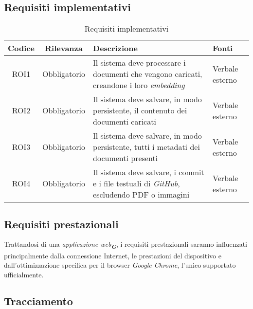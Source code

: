 \subsection{Requisiti implementativi}
\label{sec:Requisiti_implementativi}
\begin{table}[h!]
    \centering
    \renewcommand{\arraystretch}{1.6} %
    \begin{tabularx}{\textwidth}{|>{\centering\arraybackslash}c|>{\centering\arraybackslash}c|>{\centering\arraybackslash}X|>{\centering\arraybackslash}p{3cm}|} \hline
    \rowcolor[HTML]{FFD700} 
    \textbf{Codice} & \textbf{Rilevanza} & \textbf{Descrizione} & \textbf{Fonti} \\ \hline
    ROI1 & Obbligatorio & Il sistema deve processare i documenti che vengono caricati, creandone i loro \emph{embedding} & Verbale esterno\\ \hline
    ROI2 & Obbligatorio & Il sistema deve salvare, in modo persistente, il contenuto dei documenti caricati & Verbale esterno \\ \hline
    ROI3 & Obbligatorio & Il sistema deve salvare, in modo persistente, tutti i metadati dei documenti presenti & Verbale esterno\\ \hline
    ROI4 & Obbligatorio & Il sistema deve salvare, i commit e i file testuali di \emph{GitHub}, escludendo PDF o immagini & Verbale esterno\\ \hline
    \end{tabularx}
    \caption{Requisiti implementativi}
    \label{tab:Requisiti_implementativi}
\end{table}

\subsection{Requisiti prestazionali}
\label{sec:req_prestazionali}
Trattandosi di una \emph{applicazione web}\textsubscript{\textit{\textbf{G}}}, i requisiti prestazionali saranno influenzati principalmente dalla connessione Internet, 
le prestazioni del dispositivo e dall'ottimizzazione specifica per il browser \emph{Google Chrome}, l'unico supportato ufficialmente.

\newpage
\subsection{Tracciamento}
